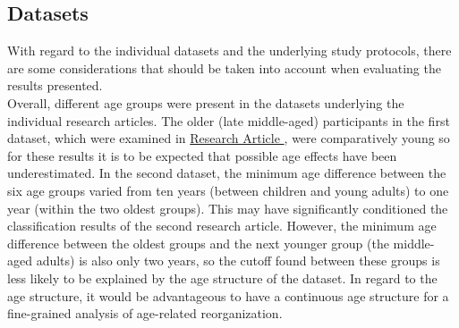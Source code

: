 \subsection{Datasets}
With regard to the individual datasets and the underlying study protocols, there are some considerations that should be taken into account when evaluating the results presented.\\
Overall, different age groups were present in the datasets underlying the individual research articles. The older (late middle-aged) participants in the first dataset, which were examined in \hyperref[results:paperI]{Research Article }, were comparatively young so for these results it is to be expected that possible age effects have been underestimated. In the second dataset, the minimum age difference between the six age groups varied from ten years (between children and young adults) to one year (within the two oldest groups). This may have significantly conditioned the classification results of the second research article. However, the minimum age difference between the oldest groups and the next younger group (the middle-aged adults) is also only two years, so the cutoff found between these groups is less likely to be explained by the age structure of the dataset. In regard to the age structure, it would be advantageous to have a continuous age structure for a fine-grained analysis of age-related reorganization.\\
